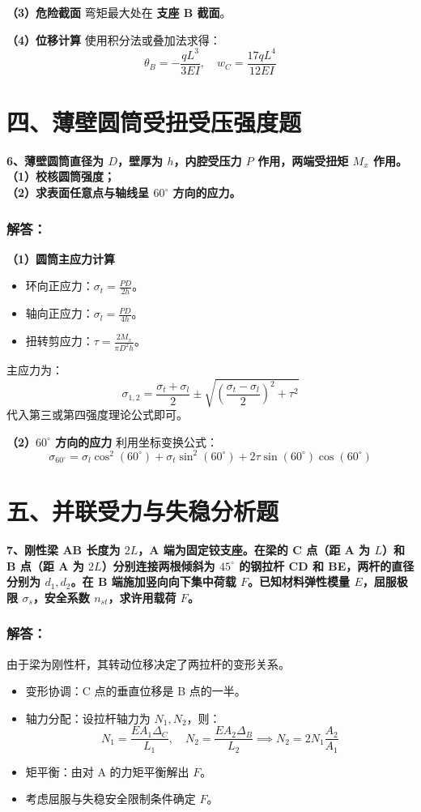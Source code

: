 \documentclass[UTF8,fontset=windows]{ctexart}
\begin{document}
\textbf{（3）危险截面}
弯矩最大处在 \textbf{支座 B 截面}。

\textbf{（4）位移计算}
使用积分法或叠加法求得：
\[
    \theta_B = -\frac{qL^3}{3EI}, \quad w_C = \frac{17 q L^4}{12 EI}
\]

\newpage

\section*{四、薄壁圆筒受扭受压强度题}

\textbf{6、薄壁圆筒直径为 $D$，壁厚为 $h$，内腔受压力 $P$ 作用，两端受扭矩 $M_x$ 作用。\\
（1）校核圆筒强度；\\
（2）求表面任意点与轴线呈 $60^\circ$ 方向的应力。}

\subsubsection*{解答：}
\textbf{（1）圆筒主应力计算}
\begin{itemize}
    \item 环向正应力：$\sigma_t = \frac{P D}{2h}$。
    \item 轴向正应力：$\sigma_l = \frac{P D}{4h}$。
    \item 扭转剪应力：$\tau = \frac{2 M_x}{\pi D^2 h}$。
\end{itemize}
主应力为：
\[
    \sigma_{1,2} = \frac{\sigma_t + \sigma_l}{2} \pm \sqrt{\left(\frac{\sigma_t - \sigma_l}{2}\right)^2 + \tau^2}
\]
代入第三或第四强度理论公式即可。

\textbf{（2）$60^\circ$ 方向的应力}
利用坐标变换公式：
\[
    \sigma_{60^\circ} = \sigma_l \cos^2(60^\circ) + \sigma_t \sin^2(60^\circ) + 2\tau \sin(60^\circ)\cos(60^\circ)
\]

\newpage

\section*{五、并联受力与失稳分析题}

\textbf{7、刚性梁 AB 长度为 $2L$，A 端为固定铰支座。在梁的 C 点（距 A 为 $L$）和 B 点（距 A 为 $2L$）分别连接两根倾斜为 $45^\circ$ 的钢拉杆 CD 和 BE，两杆的直径分别为 $d_1, d_2$。在 B 端施加竖向向下集中荷载 $F$。已知材料弹性模量 $E$，屈服极限 $\sigma_s$，安全系数 $n_{st}$，求许用载荷 $F$。}

\subsubsection*{解答：}
由于梁为刚性杆，其转动位移决定了两拉杆的变形关系。
\begin{itemize}
    \item 变形协调：C 点的垂直位移是 B 点的一半。
    \item 轴力分配：设拉杆轴力为 $N_1, N_2$，则：
    \[
        N_1 = \frac{E A_1 \Delta_C}{L_1}, \quad N_2 = \frac{E A_2 \Delta_B}{L_2} \implies N_2 = 2 N_1 \frac{A_2}{A_1}
    \]
    \item 矩平衡：由对 A 的力矩平衡解出 $F$。
    \item 考虑屈服与失稳安全限制条件确定 $F$。
\end{itemize}
\end{document}

